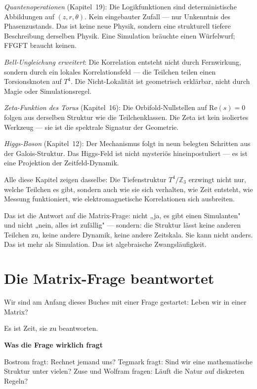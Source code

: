 \documentclass[11pt,oneside]{book}
\begin{document}
\textit{Quantenoperationen} (Kapitel~19): Die Logikfunktionen sind
deterministische Abbildungen auf $(z, r, \theta)$. Kein eingebauter
Zufall — nur Unkenntnis des Phasenzustands. Das ist keine neue Physik,
sondern eine strukturell tiefere Beschreibung derselben Physik. Eine
Simulation bräuchte einen Würfelwurf; FFGFT braucht keinen.

\textit{Bell-Ungleichung erweitert}: Die Korrelation entsteht nicht durch
Fernwirkung, sondern durch ein lokales Korrelationsfeld — die Teilchen
teilen einen Torsionsknoten auf $T^4$. Die Nicht-Lokalität ist geometrisch
erklärbar, nicht durch Magie oder Simulationsregel.

\textit{Zeta-Funktion des Torus} (Kapitel~16): Die Orbifold-Nullstellen
auf $\text{Re}(s)=0$ folgen aus derselben Struktur wie die Teilchenklassen.
Die Zeta ist kein isoliertes Werkzeug — sie ist die spektrale Signatur
der Geometrie.

\textit{Higgs-Boson} (Kapitel~12): Der Mechanismus folgt in neun belegten
Schritten aus der Galois-Struktur. Das Higgs-Feld ist nicht mysteriös
hineinpostuliert — es ist eine Projektion der Zeitfeld-Dynamik.

Alle diese Kapitel zeigen dasselbe: Die Tiefenstruktur $T^4/\mathbb{Z}_3$
erzwingt nicht nur, welche Teilchen es gibt, sondern auch wie sie sich
verhalten, wie Zeit entsteht, wie Messung funktioniert, wie
elektromagnetische Korrelationen sich ausbreiten.

Das ist die Antwort auf die Matrix-Frage: nicht „ja, es gibt einen
Simulanten" und nicht „nein, alles ist zufällig" — sondern: die Struktur
lässt keine anderen Teilchen zu, keine andere Dynamik, keine andere
Zeitskala. Sie kann nicht anders. Das ist mehr als Simulation.
Das ist algebraische Zwangsläufigkeit.




\chapter{Die Matrix-Frage beantwortet}

Wir sind am Anfang dieses Buches mit einer Frage gestartet: Leben wir
in einer Matrix?


Es ist Zeit, sie zu beantworten.


\textbf{Was die Frage wirklich fragt}


Bostrom fragt: Rechnet jemand uns? Tegmark fragt: Sind wir eine
mathematische Struktur unter vielen? Zuse und Wolfram fragen: Läuft
die Natur auf diskreten Regeln?
\end{document}
